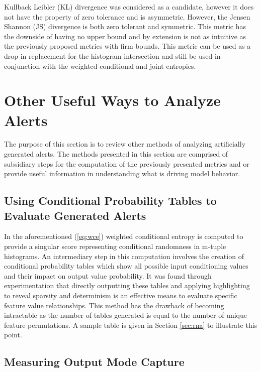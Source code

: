 
Kullback Leibler (KL) divergence was considered as a candidate, however it does not have the property of zero tolerance and is asymmetric. However, the Jensen Shannon (JS) divergence is both zero tolerant and symmetric. This metric has the downside of having no upper bound and by extension is not as intuitive as the previously proposed metrics with firm bounds. This metric can be used as a drop in replacement for the histogram intersection and still be used in conjunction with the weighted conditional and joint entropies.

\section{Other Useful Ways to Analyze Alerts}

The purpose of this section is to review other methods of analyzing artificially generated alerts. The methods presented in this section are comprised of subsidiary steps for the computation of the previously presented metrics and or provide useful information in understanding what is driving model behavior. 

\subsection{Using Conditional Probability Tables to Evaluate Generated Alerts}

In the aforementioned (\ref{eq:wce}) weighted conditional entropy is computed to provide a singular score representing conditional randomness in m-tuple histograms. An intermediary step in this computation involves the creation of conditional probability tables which show all possible input conditioning values and their impact on output value probability. It was found through experimentation that directly outputting these tables and applying highlighting to reveal sparsity and determinism is an effective means to evaluate specific feature value relationships. This method has the drawback of becoming intractable as the number of tables generated is equal to the number of unique feature permutations. A sample table is given in Section \ref{sec:rna} to illustrate this point. 

\subsection{Measuring Output Mode Capture}

